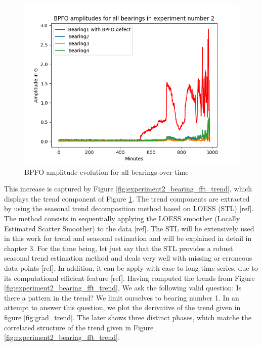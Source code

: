 \documentclass[../Main/thesis.tex]{subfiles}
\begin{document}
\begin{figure}[H] 
   \centering
    \includegraphics[width=4.9in]{../fig/experiment2_bearing_fft_amp.png}
   \caption{BPFO amplitude evolution for all bearings over time}
   \label{fig:experiment2_bearing_fft_amp}
\end{figure}
\justify
This increase is captured by Figure \ref{fig:experiment2_bearing_fft_trend}, which displays the trend component of Figure  \ref{fig:experiment2_bearing_fft_amp}.
The trend components are extracted by using the seasonal trend decomposition method based on LOESS (STL) [ref]. The method consists in sequentially applying the LOESS smoother (Locally Estimated Scatter Smoother) to the data [ref]. The STL will be extensively used in this work for trend and seasonal estimation and will be explained in detail in chapter 3. For the time being, let just say that the STL provides a robust seasonal trend estimation method and deals very well with missing or erroneous data points [ref]. In addition, it can be apply with ease to long time series, due to its computational efficient feature [ref].
\justify
Having computed the trends from Figure  \ref{fig:experiment2_bearing_fft_trend}, We ask the following valid question: Is there a pattern in the trend?  We limit ourselves to bearing number 1. In an attempt to answer this question, we plot the derivative of the trend given in figure  \ref{fig:grad_trend}. The later shows three distinct phases, which matche the correlated structure of the trend given in Figure \ref{fig:experiment2_bearing_fft_trend}. 
\end{document}
